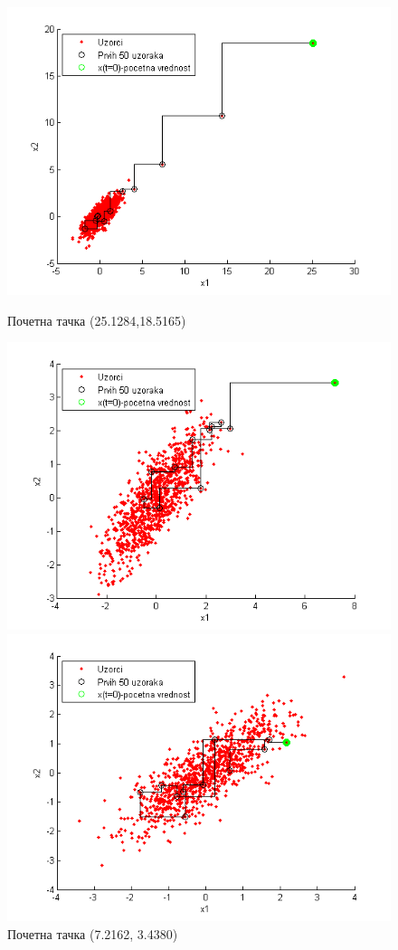 \begin{figure}[H]
  \includegraphics[scale=0.4]{./Slike/slika22.png} 
  \caption{Почетна тачка (25.1284,18.5165)}\label{fig:slika22}
\endminipage\hfill
{}
  \includegraphics[scale=0.4]{./Slike/slika23.png} 
  \caption{Почетна тачка (7.2162, 3.4380)}\label{fig:slika23}
\endminipage\hfill
{}%
   \includegraphics[scale=0.4]{./Slike/slika24.png} 

\end{figure}
